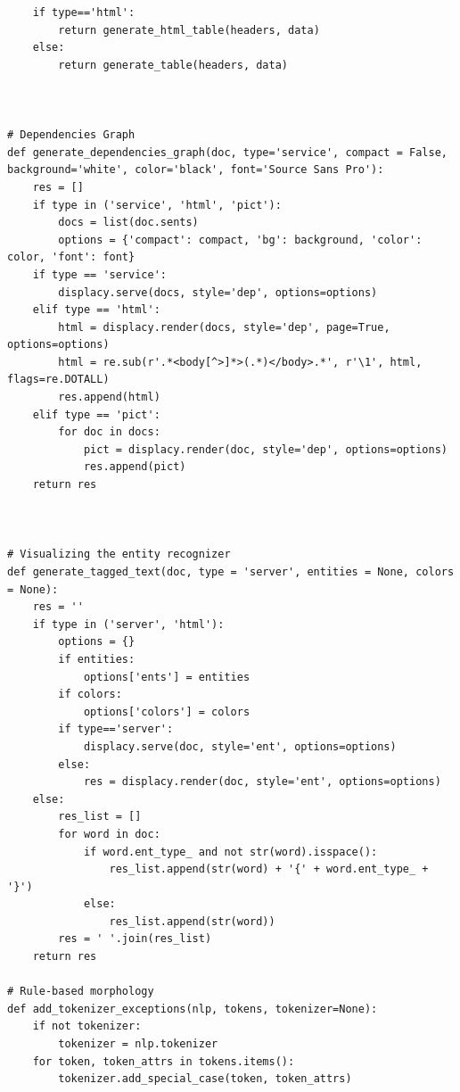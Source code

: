 \documentclass[12pt]{article}
\begin{document}
\begin{verbatim}
    if type=='html':
        return generate_html_table(headers, data)
    else:
        return generate_table(headers, data)



# Dependencies Graph
def generate_dependencies_graph(doc, type='service', compact = False, background='white', color='black', font='Source Sans Pro'):
    res = []
    if type in ('service', 'html', 'pict'):
        docs = list(doc.sents)
        options = {'compact': compact, 'bg': background, 'color': color, 'font': font}
    if type == 'service':
        displacy.serve(docs, style='dep', options=options)
    elif type == 'html':
        html = displacy.render(docs, style='dep', page=True, options=options)
        html = re.sub(r'.*<body[^>]*>(.*)</body>.*', r'\1', html, flags=re.DOTALL)
        res.append(html)
    elif type == 'pict':
        for doc in docs:
            pict = displacy.render(doc, style='dep', options=options)
            res.append(pict)
    return res



# Visualizing the entity recognizer
def generate_tagged_text(doc, type = 'server', entities = None, colors = None):
    res = ''
    if type in ('server', 'html'):
        options = {}
        if entities:
            options['ents'] = entities
        if colors:
            options['colors'] = colors
        if type=='server':
            displacy.serve(doc, style='ent', options=options)
        else:
            res = displacy.render(doc, style='ent', options=options)
    else:
        res_list = []
        for word in doc:
            if word.ent_type_ and not str(word).isspace():
                res_list.append(str(word) + '{' + word.ent_type_ + '}')
            else:
                res_list.append(str(word))
        res = ' '.join(res_list)
    return res

# Rule-based morphology
def add_tokenizer_exceptions(nlp, tokens, tokenizer=None):
    if not tokenizer:
        tokenizer = nlp.tokenizer
    for token, token_attrs in tokens.items():
        tokenizer.add_special_case(token, token_attrs)
\end{verbatim}

\newpage
\end{document}
